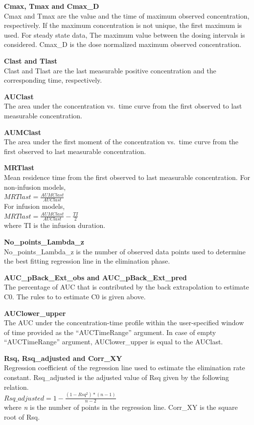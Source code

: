 \documentclass[12pt,]{krantz}
\begin{document}
\textbf{Cmax, Tmax and Cmax\_D}\\
Cmax and Tmax are the value and the time of maximum observed concentration, respectively. If the maximum concentration is not unique, the first maximum is used. For steady state data, The maximum value between the dosing intervals is considered. Cmax\_D is the dose normalized maximum observed concentration.

\textbf{Clast and Tlast}\\
Clast and Tlast are the last measurable positive concentration and the corresponding time, respectively.

\textbf{AUClast}\\
The area under the concentration vs.~time curve from the first observed to last measurable concentration.

\textbf{AUMClast}\\
The area under the first moment of the concentration vs.~time curve from the first observed to last measurable concentration.

\textbf{MRTlast}\\
Mean residence time from the first observed to last measurable concentration. For non-infusion models,\\
\(MRTlast = \frac{AUMClast}{AUClast}\)\\
For infusion models,\\
\(MRTlast = \frac{AUMClast}{AUClast}-\frac{TI}{2}\)\\
where TI is the infusion duration.

\textbf{No\_points\_Lambda\_z}\\
No\_points\_Lambda\_z is the number of observed data points used to determine the best fitting regression line in the elimination phase.

\textbf{AUC\_pBack\_Ext\_obs and AUC\_pBack\_Ext\_pred}\\
The percentage of AUC that is contributed by the back extrapolation to estimate C0. The rules to to estimate C0 is given above.

\textbf{AUClower\_upper}\\
The AUC under the concentration-time profile within the user-specified window of time provided as the ``AUCTimeRange'' argument. In case of empty ``AUCTimeRange'' argument, AUClower\_upper is equal to the AUClast.

\textbf{Rsq, Rsq\_adjusted and Corr\_XY}\\
Regression coefficient of the regression line used to estimate the elimination rate constant. Rsq\_adjusted is the adjusted value of Rsq given by the following relation.\\
\(Rsq\_adjusted = 1-\frac{(1-Rsq^2)*(n-1)}{n-2}\)\\
where \emph{n} is the number of points in the regression line. Corr\_XY is the square root of Rsq.
\end{document}
